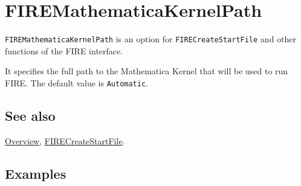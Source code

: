 \documentclass[../FeynHelpersManual.tex]{subfiles}
\begin{document}
\hypertarget{firemathematicakernelpath}{
\section{FIREMathematicaKernelPath}\label{firemathematicakernelpath}}

\texttt{FIREMathematicaKernelPath} is an option for
\texttt{FIRECreateStartFile} and other functions of the FIRE interface.

It specifies the full path to the Mathematica Kernel that will be used
to run FIRE. The default value is \texttt{Automatic}.

\subsection{See also}

\hyperlink{toc}{Overview},
\hyperlink{firecreatestartfile}{FIRECreateStartFile}.

\subsection{Examples}
\end{document}
